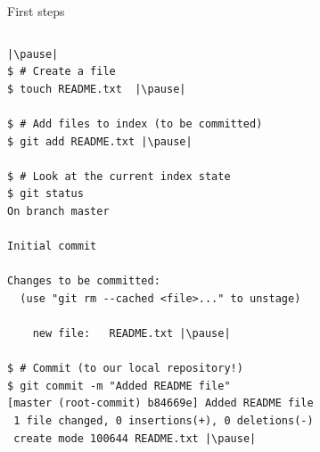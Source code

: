 \begin{frame}[fragile]{First steps}
	\begin{columns}
		\begin{column}{0.6\textwidth}
			\begin{lstlisting}
|\pause|
$ # Create a file
$ touch README.txt  |\pause|

$ # Add files to index (to be committed)
$ git add README.txt |\pause|

$ # Look at the current index state 
$ git status
On branch master

Initial commit

Changes to be committed:
  (use "git rm --cached <file>..." to unstage)

	new file:   README.txt |\pause|

$ # Commit (to our local repository!)
$ git commit -m "Added README file"
[master (root-commit) b84669e] Added README file
 1 file changed, 0 insertions(+), 0 deletions(-)
 create mode 100644 README.txt |\pause|
 

\end{lstlisting}
\end{column}
\end{columns}
\end{frame}
